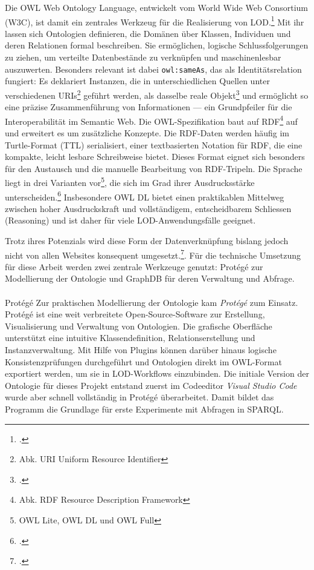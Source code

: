 \documentclass[12pt, a4paper, ngerman, bidi=default]{article}
\makeatletter
\let\cite\footcite
\let\oldparagraph\paragraph%
\renewcommand{\paragraph}{
    \@ifstar%
      \xxxParagraphStar%
      \xxxParagraphNoStar%
 }
\newcommand{\xxxParagraphStar}[1]{\oldparagraph*{#1}\mbox{}}
\newcommand{\xxxParagraphNoStar}[1]{\oldparagraph{#1}\mbox{}}
\makeatother
\begin{document}
Die OWL Web Ontology Language, entwickelt vom World Wide Web Consortium (W3C), ist damit ein zentrales Werkzeug für die Realisierung von 
LOD.\cite[ vgl.][]{smith_owl_2004} 
Mit ihr lassen sich Ontologien definieren, die Domänen über Klassen, Individuen und deren Relationen formal beschreiben. 
Sie ermöglichen, logische Schlussfolgerungen zu ziehen, um verteilte Datenbestände zu verknüpfen und maschinenlesbar auszuwerten.
Besonders relevant ist dabei \texttt{owl:sameAs}, das als Identitätsrelation fungiert: 
Es deklariert Instanzen, die in unterschiedlichen Quellen unter verschiedenen URIs\footnote{Abk. URI\: Uniform Resource Identifier} geführt werden, 
als dasselbe reale Objekt\cite[ vgl.][2.3. Data Aggregation and Privacy]{smith_owl_2004}
und ermöglicht so eine präzise Zusammenführung von Informationen — ein Grundpfeiler für die Interoperabilität im Semantic Web.
Die OWL-Spezifikation baut auf RDF\footnote{Abk. RDF\; Resource Description Framework} auf und erweitert es um zusätzliche Konzepte.
Die RDF-Daten werden häufig im Turtle-Format (TTL) serialisiert, einer textbasierten Notation für RDF, die eine kompakte, leicht lesbare Schreibweise bietet.
Dieses Format eignet sich besonders für den Austausch und die manuelle Bearbeitung von RDF-Tripeln.
Die Sprache liegt in drei Varianten vor\footnote{OWL Lite, OWL DL und OWL Full}, die sich im Grad ihrer Ausdrucksstärke 
unterscheiden.\cite[ vgl.][1.1. The Species of OWL.]{smith_owl_2004}
Insbesondere OWL DL bietet einen praktikablen Mittelweg zwischen hoher Ausdruckskraft und vollständigem, entscheidbarem Schliessen (Reasoning) 
und ist daher für viele LOD-Anwendungsfälle geeignet.

Trotz ihres Potenzials wird diese Form der Datenverknüpfung bislang jedoch nicht von allen Websites konsequent 
umgesetzt.\cite[ vgl.][S. 14]{garoufallou_metadata_2020}. Für die technische 
Umsetzung für diese Arbeit werden zwei zentrale Werkzeuge genutzt: Protégé zur Modellierung der Ontologie und GraphDB für deren Verwaltung und Abfrage.

\paragraph{Protégé} Zur praktischen Modellierung der Ontologie kam \textit{Protégé} zum Einsatz. 
Protégé ist eine weit verbreitete Open-Source-Software zur Erstellung, Visualisierung und Verwaltung von Ontologien.
Die grafische Oberfläche unterstützt eine intuitive Klassendefinition, 
Relationserstellung und Instanzverwaltung. 
Mit Hilfe von Plugins können darüber hinaus logische Konsistenzprüfungen durchgeführt und 
Ontologien direkt im OWL-Format exportiert werden, um sie in LOD-Workflows einzubinden.
Die initiale Version der Ontologie für dieses Projekt entstand zuerst im Codeeditor \textit{Visual Studio Code} wurde aber schnell vollständig in Protégé überarbeitet.
Damit bildet das Programm die Grundlage für erste Experimente mit Abfragen in SPARQL.%
\end{document}
